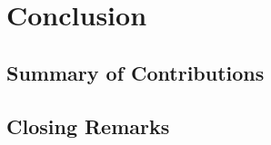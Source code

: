 \chapter{Conclusion}
\label{chap:conclusion}

\section{Summary of Contributions}
\label{sec:conclusion-summary}

\section{Closing Remarks}
\label{sec:conclusion-closing}
